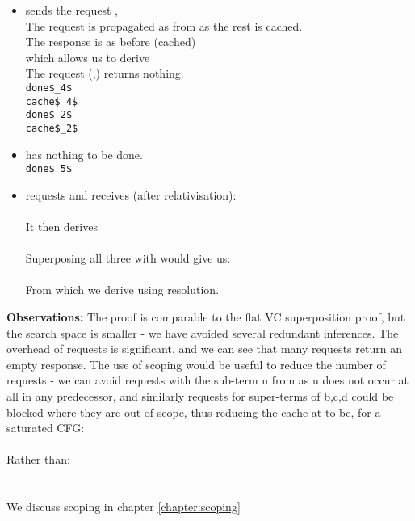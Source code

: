 \begin{itemize}
\item {} sends the request ,\\
The request is propagated as  from  as the rest is cached.\\
The response is as before (cached) \\
which allows us to derive \\
The request (,) returns nothing.\\
	\lstinline|done$_4$|\\
	\lstinline|cache$_4$|\\
	\lstinline|done$_2$|\\
	\lstinline|cache$_2$|
	
\item {} has nothing to be done.\\
	\lstinline|done$_5$|\m{= \emptyset}

\item {} requests  and receives (after relativisation):\\
\\
It then derives \\
\\
Superposing all three with  would give us:\\
\\
From which we derive \emptyClause{} using resolution.
\end{itemize}

\bigskip
\noindent
\textbf{Observations:}
The proof is comparable to the flat VC superposition proof, but the search space is smaller - 
we have avoided several redundant inferences. The overhead of requests is significant, and we can see that many requests return an empty response. The use of scoping would be useful to reduce the number of requests - we can avoid requests with the sub-term u from  as 
u does not occur at all in any predecessor, and similarly requests for super-terms of b,c,d could be blocked where they are out of scope, 
thus reducing the cache at  to be, for a saturated CFG:\\
	\\
Rather than:\\
	\\
	\\
	We discuss scoping in chapter \ref{chapter:scoping}


